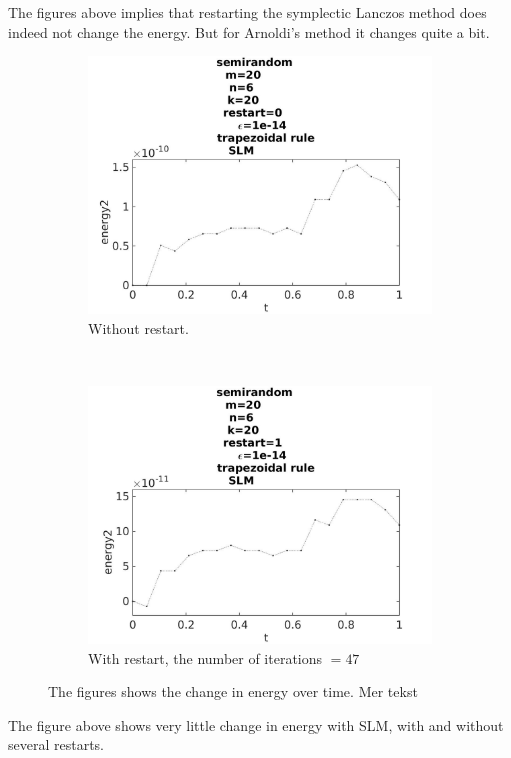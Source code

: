 The figures above implies that restarting the symplectic Lanczos method does indeed not change the energy. But for Arnoldi's method it changes quite a bit. 

\begin{figure}[H]
        \centering
        \begin{subfigure}[b]{0.45\textwidth}
                \includegraphics[width=\textwidth]{../MATLAB/fig/energytestrestart0.jpg}
                \caption{ Without restart. }
                \label{fig:energytestrestart0}
        \end{subfigure}
        ~
        \begin{subfigure}[b]{0.45\textwidth}
                \includegraphics[width=\textwidth]{../MATLAB/fig/energytestrestart1.jpg}
                \caption{ With restart, the number of iterations $= 47$ }
                \label{fig:energytestrestart1}
        \end{subfigure}
        \caption{ The figures shows the change in energy over time. Mer tekst  }
        \label{fig:energytestrestart}
\end{figure}
The figure above shows very little change in energy with SLM, with and without several restarts. \\

